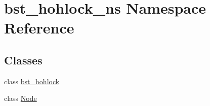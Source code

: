 \hypertarget{namespacebst__hohlock__ns}{}\section{bst\+\_\+hohlock\+\_\+ns Namespace Reference}
\label{namespacebst__hohlock__ns}
\subsection*{Classes}
\begin{DoxyCompactItemize}
\item 
class \hyperlink{classbst__hohlock__ns_1_1bst__hohlock}{bst\+\_\+hohlock}
\item 
class \hyperlink{classbst__hohlock__ns_1_1Node}{Node}
\end{DoxyCompactItemize}
